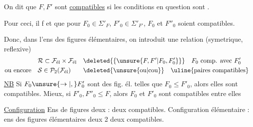 On dit que $F,F'$ sont \uline{compatibles} si les conditions en question sont .

Pour ceci, il f et  que pour  $F_0\in\Sigma'_F$, $F'_0\in\Sigma'_{F'}$, $F_0$ et $F''_0$ soient compatibles.

Donc, dans l'ens  des figures élémentaires, on introduit une relation (symetrique, reflexive)
\[
\begin{aligned}
&\mathcal{R}\subset\mathcal{F}_{\text{él}}\times\mathcal{F}_{\text{él}}&&\deleted{\{\unsure{F,F'|F_0,F'_0}\}}\quad \text{$F_0$ comp. avec $F'_0$}\\
\text{ou encore}\quad&\mathcal{S}\in\mathcal{P}_2(\mathcal{F}_{\text{él}})&&\deleted{\text{\unsure{ou|cou}}}\quad\text{\uline{paires compatibles}}
\end{aligned}
\]
\uline{NB} Si  $F_0\unsure{\to|,} F'_0$ sont des fig. él. telles que $F_0\le F'_0$, alors elles sont compatibles. Mieux, si $F'_0,F''_0\le F$, alors $F_0$ et $F'_0$ sont compatibles entre elles

\uline{Configuration} Ens de figures deux : deux compatibles. Configuration élémentaire : ens des figures élémentaires deux 2 deux compatibles.
